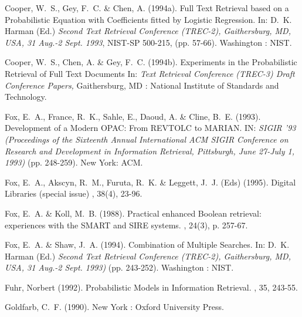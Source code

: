 \begin{thebibliography}{99}
Cooper, W.~S., Gey, F.~C. \& Chen, A. (1994a).
\newblock Full Text Retrieval based on a Probabilistic Equation with
Coefficients fitted by Logistic Regression.
\newblock In: D.~K. Harman (Ed.) {\em Second Text Retrieval Conference (TREC-2), Gaithersburg, MD, 
USA, 31 Aug.-2 Sept. 1993}, NIST-SP 500-215, (pp. 57-66).  Washington : NIST.

Cooper, W.~S., Chen, A. \& Gey, F.~C. (1994b).
\newblock Experiments in the Probabilistic Retrieval of Full Text Documents
\newblock In: {\em Text Retrieval Conference (TREC-3) Draft Conference
Papers,} Gaithersburg, MD : National Institute of Standards and Technology.

Fox, E.~A., France, R.~K., Sahle, E., Daoud, A. \& Cline, B.~E. (1993).
\newblock Development of a Modern OPAC: From REVTOLC to MARIAN.
\newblock IN: {\em SIGIR '93 (Proceedings of the Sixteenth Annual International
ACM SIGIR Conference on Research and Development in Information Retrieval,
Pittsburgh, June 27-July 1, 1993)} (pp. 248-259). New York: ACM.

Fox, E.~A., Akscyn, R.~M., Furuta, R.~K. \& Leggett, J.~J. (Eds) (1995).
\newblock Digital Libraries (special issue)
, 38(4), 23-96.

Fox, E.~A. \& Koll, M.~B. (1988). 
\newblock Practical enhanced Boolean retrieval: 
experiences with the SMART and SIRE systems. 
, 24(3), p. 257-67. 

Fox, E.~A. \& Shaw, J.~A. (1994). 
\newblock Combination of Multiple Searches.
\newblock In: D.~K. Harman (Ed.) {\em Second Text Retrieval Conference (TREC-2), Gaithersburg, MD, 
USA, 31 Aug.-2 Sept. 1993)} (pp. 243-252).  Washington : NIST.

Fuhr, Norbert (1992).
\newblock Probabilistic Models in Information Retrieval.
, 35, 243-55.

Goldfarb, C.~F. (1990).
\newblock New York : Oxford University Press.


\end{thebibliography}
